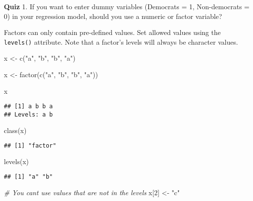 \documentclass[
]{book}
\newenvironment{Shaded}{\begin{snugshade}}{\end{snugshade}}
\newcommand{\CommentTok}[1]{\textcolor[rgb]{0.56,0.35,0.01}{\textit{#1}}}
\newcommand{\DecValTok}[1]{\textcolor[rgb]{0.00,0.00,0.81}{#1}}
\newcommand{\FunctionTok}[1]{\textcolor[rgb]{0.00,0.00,0.00}{#1}}
\newcommand{\NormalTok}[1]{#1}
\newcommand{\OtherTok}[1]{\textcolor[rgb]{0.56,0.35,0.01}{#1}}
\newcommand{\StringTok}[1]{\textcolor[rgb]{0.31,0.60,0.02}{#1}}
\begin{document}
\textbf{Quiz}
1. If you want to enter dummy variables (Democrats = 1, Non-democrats = 0) in your regression model, should you use a numeric or factor variable?

Factors can only contain pre-defined values. Set allowed values using the \texttt{levels()} attribute. Note that a factor's levels will always be character values.

\begin{Shaded}
\begin{Highlighting}[]
\NormalTok{x }\OtherTok{\textless{}{-}} \FunctionTok{c}\NormalTok{(}\StringTok{"a"}\NormalTok{, }\StringTok{"b"}\NormalTok{, }\StringTok{"b"}\NormalTok{, }\StringTok{"a"}\NormalTok{)}

\NormalTok{x }\OtherTok{\textless{}{-}} \FunctionTok{factor}\NormalTok{(}\FunctionTok{c}\NormalTok{(}\StringTok{"a"}\NormalTok{, }\StringTok{"b"}\NormalTok{, }\StringTok{"b"}\NormalTok{, }\StringTok{"a"}\NormalTok{))}

\NormalTok{x}
\end{Highlighting}
\end{Shaded}

\begin{verbatim}
## [1] a b b a
## Levels: a b
\end{verbatim}

\begin{Shaded}
\begin{Highlighting}[]
\FunctionTok{class}\NormalTok{(x)}
\end{Highlighting}
\end{Shaded}

\begin{verbatim}
## [1] "factor"
\end{verbatim}

\begin{Shaded}
\begin{Highlighting}[]
\FunctionTok{levels}\NormalTok{(x)}
\end{Highlighting}
\end{Shaded}

\begin{verbatim}
## [1] "a" "b"
\end{verbatim}

\begin{Shaded}
\begin{Highlighting}[]
\CommentTok{\# You can\textquotesingle{}t use values that are not in the levels}
\NormalTok{x[}\DecValTok{2}\NormalTok{] }\OtherTok{\textless{}{-}} \StringTok{"c"}
\end{Highlighting}
\end{Shaded}
\end{document}
